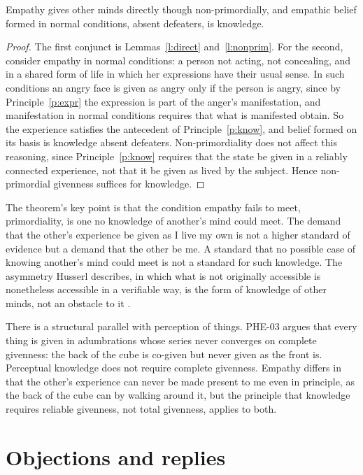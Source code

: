 \documentclass{situationist-preprint}
\begin{document}
\begin{theorem}\label{t:know}
Empathy gives other minds directly though non-primordially, and empathic belief formed in normal conditions, absent defeaters, is knowledge.
\end{theorem}

\begin{proof}
The first conjunct is Lemmas~\ref{l:direct} and~\ref{l:nonprim}. For the second, consider empathy in normal conditions: a person not acting, not concealing, and in a shared form of life in which her expressions have their usual sense. In such conditions an angry face is given as angry only if the person is angry, since by Principle~\ref{p:expr} the expression is part of the anger's manifestation, and manifestation in normal conditions requires that what is manifested obtain. So the experience satisfies the antecedent of Principle~\ref{p:know}, and belief formed on its basis is knowledge absent defeaters. Non-primordiality does not affect this reasoning, since Principle~\ref{p:know} requires that the state be given in a reliably connected experience, not that it be given as lived by the subject. Hence non-primordial givenness suffices for knowledge.
\end{proof}

The theorem's key point is that the condition empathy fails to meet, primordiality, is one no knowledge of another's mind could meet. The demand that the other's experience be given as I live my own is not a higher standard of evidence but a demand that the other be me. A standard that no possible case of knowing another's mind could meet is not a standard for such knowledge. The asymmetry Husserl describes, in which what is not originally accessible is nonetheless accessible in a verifiable way, is the form of knowledge of other minds, not an obstacle to it \citep[\S52]{Husserl1950}.

There is a structural parallel with perception of things. PHE-03 argues that every thing is given in adumbrations whose series never converges on complete givenness: the back of the cube is co-given but never given as the front is. Perceptual knowledge does not require complete givenness. Empathy differs in that the other's experience can never be made present to me even in principle, as the back of the cube can by walking around it, but the principle that knowledge requires reliable givenness, not total givenness, applies to both.

\section{Objections and replies}
\end{document}
